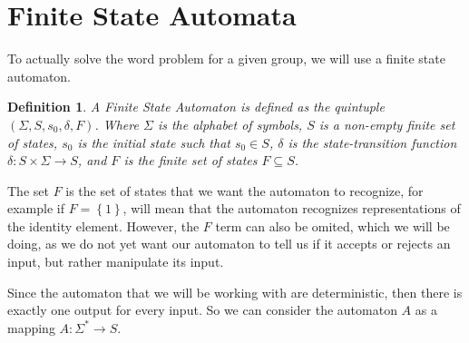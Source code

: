 \documentclass[10pt]{amsart}
\newtheorem{idefinition}{Definition}
\theoremstyle{definition}
\theoremstyle{remark}
\newenvironment{definition}{\begin{center}\begin{minipage}{0.9\textwidth}\begin{idefinition}}{\end{idefinition}\end{minipage}\end{center}}
\begin{document}
\section{Finite State Automata}%
\label{sec:Finite State Automata}

To actually solve the word problem for a given group, we will use a finite
state automaton.

\begin{definition}
  A Finite State Automaton is defined as the quintuple $\left(\Sigma, S, s_0,
    \delta, F\right)$. Where $\Sigma$ is the alphabet of symbols, $S$ is a
  non-empty finite set of states, $s_0$ is the initial state such that $s_0\in
  S$, $\delta$ is the state-transition function $\delta:S\times\Sigma\rightarrow
  S$, and $F$ is the finite set of states $F\subseteq S$.
\end{definition}

The set $F$ is the set of states that we want the automaton to
recognize, for example if $F=\left\{1\right\}$, will mean that the automaton
recognizes representations of the identity element. However, the $F$ term can
also be omited, which we will be doing, as we do not yet want our automaton to
tell us if it accepts or rejects an input, but rather manipulate its input.

Since the automaton that we will be working with are deterministic, then there
is exactly one output for every input. So we can consider the automaton $A$ as
a mapping $A:\Sigma^*\rightarrow S$.
\end{document}
